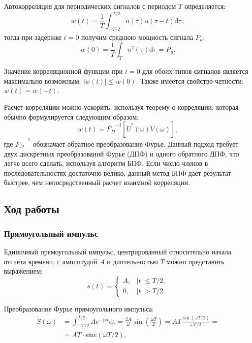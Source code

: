 \documentclass[12pt,a4paper]{article}
\begin{document}
Автокорреляция для периодических сигналов с периодом $T$ определяется:
\begin{equation}
\nonumber
w(t)=\frac{1}{T}\int_{-T/2}^{T/2}{u(\tau)u(\tau-t)\mathrm{d\tau}},
\end{equation}
тогда при задержке $t=0$ получим среднюю мощность сигнала $P_u$:
\begin{equation}
w(0)=\frac{1}{T}\int_{T}{u^2(\tau)\mathrm{d\tau}}=P_u.
\end{equation}

Значение корреляционной функции при $t=0$ для обоих типов сигналов является максимально возможным: $|w(t)|\leq w(0)$. Также имеется свойство четности: $w(t)=w(-t)$.

Расчет корреляции можно ускорить, используя теорему о корреляции, которая обычно формулируется следующим образом:
\begin{equation}
w(t)=\dot{F_D}^{-1}\left[\dot{U}^*(\omega)\dot{V}(\omega)\right],
\end{equation}
где $\dot{F_D}^{-1}$ обозначает обратное преобразование Фурье. Данный подход требует двух дискретных преобразований Фурье (ДПФ) и одного обратного ДПФ, что легче всего сделать, используя алгоритм БПФ. Если число членов в последовательностях достаточно велико, данный метод БПФ дает результат быстрее, чем непосредственный расчет взаимной корреляции.

\subsection{Ход работы}

\subsubsection{Прямоугольный импульс}

Единичный прямоугольный импульс, центрированный относительно начала отсчета времени, с амплитудой $A$ и длительностью $T$ можно представить выражением:
\begin{equation}
\nonumber
s\left(t\right)=
  \begin{cases}
    A, &|t| \leq T/2, \\
    0, &|t| > T/2.
  \end{cases}
\end{equation}

Преобразование Фурье прямоугольного импульса:
\begin{equation}
\begin{split}
\nonumber
\dot{S}\left(\omega\right)&=\int_{-T/2}^{T/2}{A\mathrm{e}^{-\mathrm{j}\omega t}\mathrm{dt}}=\frac{2A}{\omega}\sin\left(\frac{\omega T}{2}\right)=AT\frac{\sin\left(\omega T/2\right)}{\omega T/2}= \\
&= AT\cdot\mathrm{sinc}\left(\omega T/2\right).
\end{split}
\end{equation}
\end{document}
